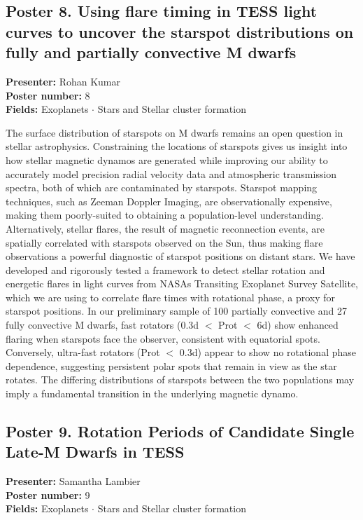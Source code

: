 \hypertarget{poster-abstract-talk-102}{}\label{poster-abstract-page-talk-102}
\subsection*{Poster 8. Using flare timing in TESS light curves to uncover the starspot distributions on fully and partially convective M dwarfs}
\textbf{Presenter:} Rohan Kumar\\
\textbf{Poster number:} 8\\
\textbf{Fields:} Exoplanets $\cdot$ Stars and Stellar cluster formation

The surface distribution of starspots on M dwarfs remains an open question in stellar astrophysics. Constraining the locations of starspots gives us insight into how stellar magnetic dynamos are generated while improving our ability to accurately model precision radial velocity data and atmospheric transmission spectra, both of which are contaminated by starspots. Starspot mapping techniques, such as Zeeman Doppler Imaging, are observationally expensive, making them poorly-suited to obtaining a population-level understanding. Alternatively, stellar flares, the result of magnetic reconnection events, are spatially correlated with starspots observed on the Sun, thus making flare observations a powerful diagnostic of starspot positions on distant stars. We have developed and rigorously tested a framework to detect stellar rotation and energetic flares in light curves from NASAs Transiting Exoplanet Survey Satellite, which we are using to correlate flare times with rotational phase, a proxy for starspot positions. In our preliminary sample of 100 partially convective and 27 fully convective M dwarfs, fast rotators (0.3d $<$ Prot $<$ 6d) show enhanced flaring when starspots face the observer, consistent with equatorial spots. Conversely, ultra-fast rotators (Prot $<$ 0.3d) appear to show no rotational phase dependence, suggesting persistent polar spots that remain in view as the star rotates. The differing distributions of starspots between the two populations may imply a fundamental transition in the underlying magnetic dynamo.

\hypertarget{poster-abstract-talk-79}{}\label{poster-abstract-page-talk-79}
\subsection*{Poster 9. Rotation Periods of Candidate Single Late-M Dwarfs in TESS}
\textbf{Presenter:} Samantha Lambier\\
\textbf{Poster number:} 9\\
\textbf{Fields:} Exoplanets $\cdot$ Stars and Stellar cluster formation

